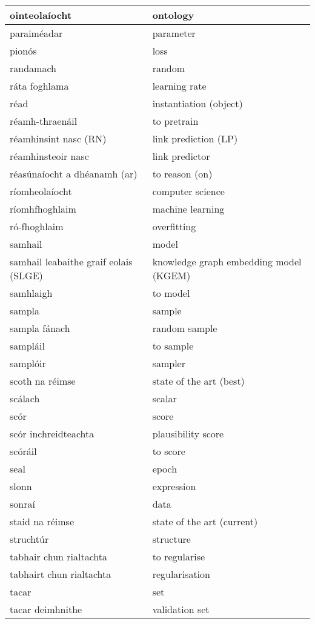 \documentclass{article}
\begin{document}
\begin{longtable}{|l|l|}
		ointeolaíocht&ontology\\ \hline 
		paraiméadar&parameter\\ \hline 
		pionós&loss\\ \hline 
		randamach&random\\ \hline 
		ráta foghlama&learning rate\\ \hline 
		réad&instantiation (object)\\ \hline 
		réamh-thraenáil&to pretrain\\ \hline 
		réamhinsint nasc (RN)&link prediction (LP)\\ \hline 
		réamhinsteoir nasc&link predictor\\ \hline 
		réasúnaíocht a dhéanamh (ar)&to reason (on)\\ \hline 
		ríomheolaíocht&computer science\\ \hline 
		ríomhfhoghlaim&machine learning\\ \hline 
		ró-fhoghlaim&overfitting\\ \hline 
		samhail&model\\ \hline 
		samhail leabaithe graif eolais (SLGE)&knowledge graph embedding model (KGEM)\\ \hline 
		samhlaigh&to model\\ \hline 
		sampla&sample\\ \hline 
		sampla fánach&random sample\\ \hline 
		sampláil&to sample\\ \hline 
		samplóir&sampler\\ \hline 
		scoth na réimse&state of the art (best)\\ \hline 
		scálach&scalar\\ \hline 
		scór&score\\ \hline 
		scór inchreidteachta&plausibility score\\ \hline 
		scóráil&to score\\ \hline 
		seal&epoch\\ \hline 
		slonn&expression\\ \hline 
		sonraí&data\\ \hline 
		staid na réimse&state of the art (current)\\ \hline 
		struchtúr&structure\\ \hline 
		tabhair chun rialtachta&to regularise\\ \hline 
		tabhairt chun rialtachta&regularisation\\ \hline 
		tacar&set\\ \hline 
		tacar deimhnithe&validation set\\ \hline 

\end{longtable}
\end{document}

